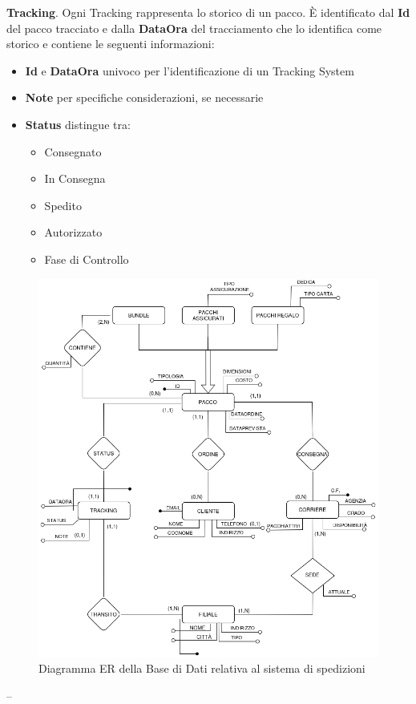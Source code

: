 \textbf{Tracking}. Ogni Tracking rappresenta lo storico di un pacco. È identificato dal \textbf{Id} del pacco tracciato e dalla \textbf{DataOra} del tracciamento che lo identifica come storico e contiene le seguenti informazioni:
\begin{itemize}
    \setlength{\itemindent}{+.5in}
    \item \textbf{Id} e \textbf{DataOra} univoco per l'identificazione di un Tracking System
    \item \textbf{Note} per specifiche considerazioni, se necessarie
    \item \textbf{Status} distingue tra:
     \begin{itemize}
            \setlength{\itemindent}{+.5in}
            \item Consegnato
            \item In Consegna
            \item Spedito
            \item Autorizzato
            \item Fase di Controllo
        \end{itemize}
\end{itemize}



\begin{figure}[H]
\centering
\includegraphics[width=1.0\textwidth]{Resources/ER.png}
\caption{Diagramma ER della Base di Dati relativa al sistema di spedizioni}
\label{ER}
\end{figure}
– 